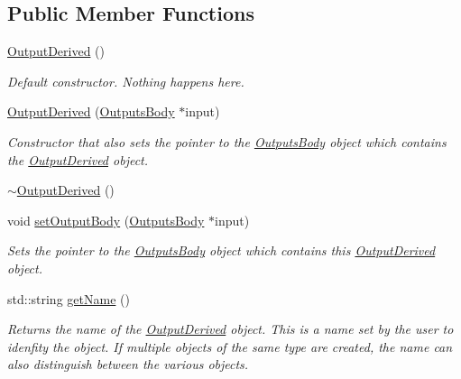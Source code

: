 \subsection*{Public Member Functions}
\begin{DoxyCompactItemize}
\item 
\hypertarget{classosea_1_1ofreq_1_1_output_derived_af8b70b70b8a5089f2b673da8b59a7b6a}{\hyperlink{classosea_1_1ofreq_1_1_output_derived_af8b70b70b8a5089f2b673da8b59a7b6a}{Output\-Derived} ()}\label{classosea_1_1ofreq_1_1_output_derived_af8b70b70b8a5089f2b673da8b59a7b6a}

\begin{DoxyCompactList}\small\item\em Default constructor. Nothing happens here. \end{DoxyCompactList}\item 
\hyperlink{classosea_1_1ofreq_1_1_output_derived_aa35993ef6d6da030cf74bca52b142ac1}{Output\-Derived} (\hyperlink{classosea_1_1ofreq_1_1_outputs_body}{Outputs\-Body} $\ast$input)
\begin{DoxyCompactList}\small\item\em Constructor that also sets the pointer to the \hyperlink{classosea_1_1ofreq_1_1_outputs_body}{Outputs\-Body} object which contains the \hyperlink{classosea_1_1ofreq_1_1_output_derived}{Output\-Derived} object. \end{DoxyCompactList}\item 
\hyperlink{classosea_1_1ofreq_1_1_output_derived_a4dde733443e52964c74d8bb6477f85f7}{$\sim$\-Output\-Derived} ()
\item 
void \hyperlink{classosea_1_1ofreq_1_1_output_derived_affb9fc146d9322b1d991cc5f5ae546d7}{set\-Output\-Body} (\hyperlink{classosea_1_1ofreq_1_1_outputs_body}{Outputs\-Body} $\ast$input)
\begin{DoxyCompactList}\small\item\em Sets the pointer to the \hyperlink{classosea_1_1ofreq_1_1_outputs_body}{Outputs\-Body} object which contains this \hyperlink{classosea_1_1ofreq_1_1_output_derived}{Output\-Derived} object. \end{DoxyCompactList}\item 
std\-::string \hyperlink{classosea_1_1ofreq_1_1_output_derived_a354f906f29b96022141afba02a50fbfe}{get\-Name} ()
\begin{DoxyCompactList}\small\item\em Returns the name of the \hyperlink{classosea_1_1ofreq_1_1_output_derived}{Output\-Derived} object. This is a name set by the user to idenfity the object. If multiple objects of the same type are created, the name can also distinguish between the various objects. \end{DoxyCompactList}\item 

\end{DoxyCompactItemize}
